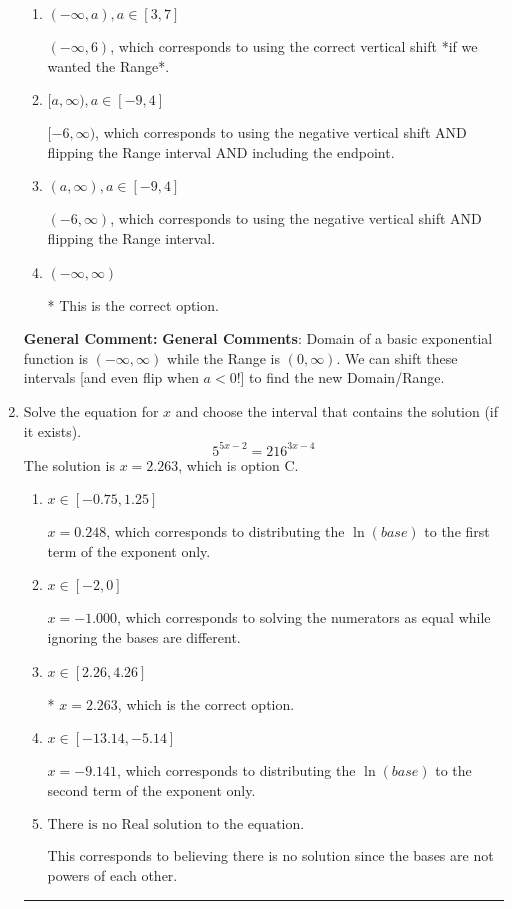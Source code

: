 \documentclass{extbook}[14pt]
\newcommand{\litem}[1]{\item #1

\rule{\textwidth}{0.4pt}}
\begin{document}
\begin{enumerate}
{\begin{enumerate}[label=\Alph*.]
$(-\infty, 6]$, which corresponds to using the correct vertical shift *if we wanted the Range* AND including the endpoint.
\item \( (-\infty, a), a \in [3, 7] \)

$(-\infty, 6)$, which corresponds to using the correct vertical shift *if we wanted the Range*.
\item \( [a, \infty), a \in [-9, 4] \)

$[-6, \infty)$, which corresponds to using the negative vertical shift AND flipping the Range interval AND including the endpoint.
\item \( (a, \infty), a \in [-9, 4] \)

$(-6, \infty)$, which corresponds to using the negative vertical shift AND flipping the Range interval.
\item \( (-\infty, \infty) \)

* This is the correct option.
\end{enumerate}

\textbf{General Comment:} \textbf{General Comments}: Domain of a basic exponential function is $(-\infty, \infty)$ while the Range is $(0, \infty)$. We can shift these intervals [and even flip when $a<0$!] to find the new Domain/Range.
}
\litem{
Solve the equation for $x$ and choose the interval that contains the solution (if it exists).
\[ 5^{5x-2} = 216^{3x-4} \]The solution is \( x = 2.263 \), which is option C.\begin{enumerate}[label=\Alph*.]
\item \( x \in [-0.75, 1.25] \)

$x = 0.248$, which corresponds to distributing the $\ln(base)$ to the first term of the exponent only.
\item \( x \in [-2, 0] \)

$x = -1.000$, which corresponds to solving the numerators as equal while ignoring the bases are different.
\item \( x \in [2.26, 4.26] \)

* $x = 2.263$, which is the correct option.
\item \( x \in [-13.14, -5.14] \)

$x = -9.141$, which corresponds to distributing the $\ln(base)$ to the second term of the exponent only.
\item \( \text{There is no Real solution to the equation.} \)

This corresponds to believing there is no solution since the bases are not powers of each other.
\end{enumerate}

}
\end{enumerate}
\end{document}
